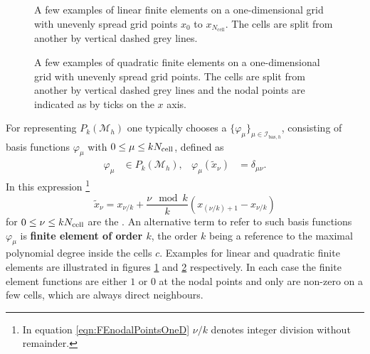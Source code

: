 \begin{figure}
	\centering
	\caption[Examples of linear finite elements in one dimension]
	{
		A few examples of linear finite elements
		on a one-dimensional grid
		with unevenly spread grid points
		$x_0$ to $x_{N_\text{cell}}$.
		The cells are split from another
		by vertical dashed grey lines.
	}
	\label{fig:FEoneDimLin}
\end{figure}
\begin{figure}
	\centering
	\caption[Examples of quadratic finite elements in one dimension]
	{
		A few examples of quadratic finite elements
		on a one-dimensional grid
		with unevenly spread grid points.
		The cells are split from another
		by vertical dashed grey lines
		and the nodal points are indicated as by ticks
		on the $x$ axis.
	}
	\label{fig:FEoneDimQuad}
\end{figure}
\newcommand{\Ibash}{\mathcal{I}_{\text{bas},h}}
For representing $P_k(\mathcal{M}_h)$
one typically chooses a  $\{\varphi_\mu\}_{\mu\in \Ibash}$,
consisting of basis functions $\varphi_\mu$ with $0 \leq \mu \leq k N_\text{cell}$,
defined as
\begin{align*}
	\varphi_\mu &\in P_k(\mathcal{M}_h), &
	\varphi_\mu(\tilde{x}_\nu) &= \delta_{\mu\nu}.
\end{align*}
In this expression%
\footnote{In equation \eqref{eqn:FEnodalPointsOneD} $\nu/k$ denotes integer division
without remainder.}
\begin{equation}
	\tilde{x}_\nu = x_{\nu/k} + \frac{\nu \!\! \mod k}{k} \left( x_{(\nu/k) +1} - x_{\nu/k} \right)
	\label{eqn:FEnodalPointsOneD}
\end{equation}
for $0 \leq \nu \leq k N_\text{cell}$ are the .
An alternative term to refer to such
basis functions $\varphi_\mu$
is \textbf{finite element of order $k$},
the order $k$ being a reference to the maximal polynomial degree inside the cells $c$.
Examples for linear and quadratic finite elements are
illustrated in figures \ref{fig:FEoneDimLin} and \ref{fig:FEoneDimQuad} respectively.
In each case the finite element functions
are either $1$ or $0$ at the nodal points and only
are non-zero on a few cells, which are always direct neighbours.

